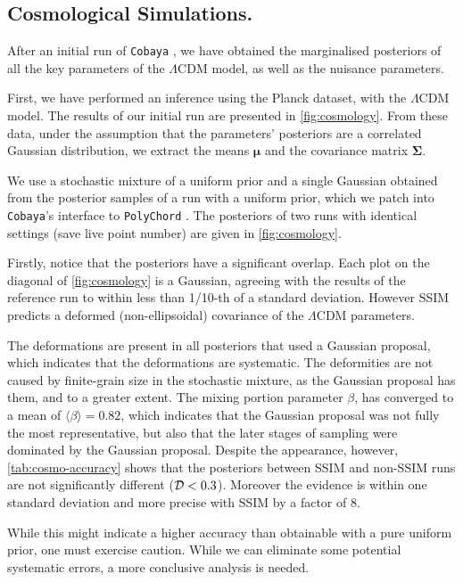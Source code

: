 \documentclass[usenatbib]{mnras}
\begin{document}
\subsection{Cosmological Simulations.}\label{sec:orgb81c159}
After an initial run of \texttt{Cobaya} \citep{cobaya}, we have obtained the marginalised
posteriors of all the key parameters of the \(\Lambda\)CDM model,
as well as the nuisance parameters.

First, we have performed an inference using the Planck \citep{Planck} dataset,
with the \(\Lambda\)CDM model. The results of our initial run are
presented in \cref{fig:cosmology}. From these data, under the
assumption that the parameters' posteriors are a correlated Gaussian
distribution, we extract the means $\bm{\mu}$ and the covariance
matrix \(\bm{\Sigma}\).

We use a stochastic mixture of a uniform prior and a single Gaussian
obtained from the posterior samples of a run with a uniform prior,
which we patch into \texttt{Cobaya}'s interface to \texttt{PolyChord}
\citep{code}. The posteriors of two runs with identical settings (save
live point number) are given in \cref{fig:cosmology}.

Firstly, notice that the posteriors have a significant overlap. Each
plot on the diagonal of \cref{fig:cosmology} is a Gaussian, agreeing
with the results of the reference run to within less than 1/10-th of a
standard deviation. However SSIM predicts a deformed (non-ellipsoidal)
covariance of the \(\Lambda\)CDM parameters. 

The deformations are present in all posteriors that used a Gaussian
proposal, which indicates that the deformations are systematic. The
deformities are not caused by finite-grain size in the stochastic
mixture, as the Gaussian proposal has them, and to a greater
extent. The mixing portion parameter $\beta$, has converged to a mean
of $\langle \beta \rangle = 0.82$, which indicates that the Gaussian
proposal was not fully the most representative, but also that the
later stages of sampling were dominated by the Gaussian
proposal. Despite the appearance, however, \cref{tab:cosmo-accuracy}
shows that the posteriors between SSIM and non-SSIM runs are not
significantly different (${\cal D}< 0.3$). Moreover the evidence is
within one standard deviation and more precise with SSIM by a factor
of \(8\).

While this might indicate a higher accuracy than obtainable with a
pure uniform prior, one must exercise caution. While we can eliminate
some potential systematic errors, a more conclusive analysis is
needed.
\end{document}
